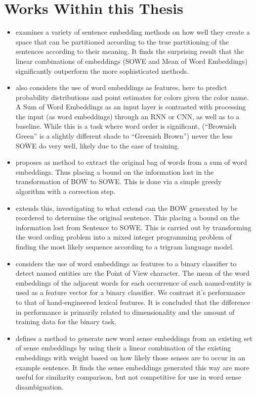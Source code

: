 \documentclass{book}
\begin{document}
\section{Works Within this Thesis}

\begin{itemize}
	\item {} examines a variety of sentence embedding methods on how well they create a space that can be partitioned according to the true partitioning of the sentences according to their meaning. It finds the surprising result that the linear combinations of embeddings (SOWE and Mean of Word Embeddings) significantly outperform the more sophisticated methods.
	\item {} also considers the use of word embeddings as features, here to predict probability distributions and point estimates for colors given the color name. A Sum of Word Embeddings as an input layer is contrasted with processing the input (as word embeddings) through an RNN or CNN, as well as to a baseline. While this is a task where word order is significant, (``Brownish Green'' is a slightly different shade to ``Greenish Brown'') never the less SOWE do very well, likely due to the ease of training.
	\item {} proposes as method to extract the original bag of words from a sum of word embeddings. Thus placing a bound on the information lost in the transformation of BOW to SOWE. This is done via a simple greedy algorithm with a correction step.
	\item {} extends this, investigating to what extend can the BOW generated by  be reordered to determine the original sentence. This placing a bound on the information lost from Sentence to SOWE. This is carried out by transforming the word ording problem into a mixed integer programming problem of finding the most likely sequence according to a trigram language model.
	\item {} considers the use of word embeddings as features to a binary classifier to detect named entities are the Point of View character. The mean of the word embeddings of the adjacent words for each occurrence of each named-entity is used as a feature vector for a binary classifier. We contrast it's performance to that of hand-engineered lexical features. It is concluded that the difference in performance is primarily related to dimensionality and the amount of training data for the binary task.
	\item {} defines a method to generate new word sense embeddings from an existing set of sense embeddings by using their a linear combination of the existing embeddings with weight based on how likely those senses are to occur in an example sentence. It finds the sense embeddings generated this way are more useful for similarity comparison, but not competitive for use in word sense disambiguation.

\end{itemize}
\end{document}
